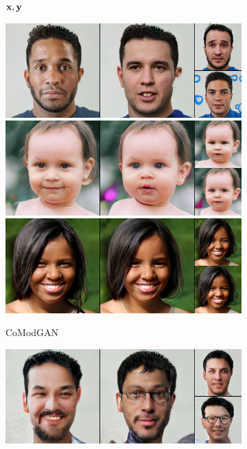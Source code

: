 \begin{figure}[t]
\begin{subfigure}[t]{0.22\textwidth}
      \caption*{$\mathbf{x}, \mathbf{y}$}
    \end{subfigure}
    \begin{subfigure}[t]{0.25\textwidth}
      \centering
      \includegraphics[height=\ffhqimgheight]{figs/cigcvae/image-samples/ffhq256/freeform_co_mod_gan_0_samples.jpg}
      \includegraphics[height=\ffhqimgheight]{figs/cigcvae/image-samples/ffhq256/freeform_co_mod_gan_13_samples.jpg}
      \includegraphics[height=\ffhqimgheight]{figs/cigcvae/image-samples/ffhq256/freeform_co_mod_gan_32_samples.jpg}
      \caption{CoModGAN}
    \end{subfigure}
    \begin{subfigure}[t]{0.25\textwidth}
      \centering
      \includegraphics[height=\ffhqimgheight]{figs/cigcvae/image-samples/ffhq256/freeform_pic_0_samples.jpg}

\end{subfigure}
\end{figure}
